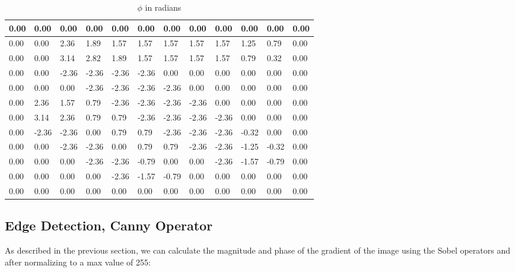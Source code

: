\documentclass[12pt, letterpaper]{article}
\begin{document}
\begin{table}[H]
    \centering
    \begin{tabular}{|l|l|l|l|l|l|l|l|l|l|l|l|}
    \hline
        0.00 & 0.00 & 0.00 & 0.00 & 0.00 & 0.00 & 0.00 & 0.00 & 0.00 & 0.00 & 0.00 & 0.00  \\ \hline
        0.00 & 0.00 & 2.36 & 1.89 & 1.57 & 1.57 & 1.57 & 1.57 & 1.57 & 1.25 & 0.79 & 0.00  \\ \hline
        0.00 & 0.00 & 3.14 & 2.82 & 1.89 & 1.57 & 1.57 & 1.57 & 1.57 & 0.79 & 0.32 & 0.00  \\ \hline
        0.00 & 0.00 & -2.36 & -2.36 & -2.36 & -2.36 & 0.00 & 0.00 & 0.00 & 0.00 & 0.00 & 0.00  \\ \hline
        0.00 & 0.00 & 0.00 & -2.36 & -2.36 & -2.36 & -2.36 & 0.00 & 0.00 & 0.00 & 0.00 & 0.00  \\ \hline
        0.00 & 2.36 & 1.57 & 0.79 & -2.36 & -2.36 & -2.36 & -2.36 & 0.00 & 0.00 & 0.00 & 0.00  \\ \hline
        0.00 & 3.14 & 2.36 & 0.79 & 0.79 & -2.36 & -2.36 & -2.36 & -2.36 & 0.00 & 0.00 & 0.00  \\ \hline
        0.00 & -2.36 & -2.36 & 0.00 & 0.79 & 0.79 & -2.36 & -2.36 & -2.36 & -0.32 & 0.00 & 0.00  \\ \hline
        0.00 & 0.00 & -2.36 & -2.36 & 0.00 & 0.79 & 0.79 & -2.36 & -2.36 & -1.25 & -0.32 & 0.00  \\ \hline
        0.00 & 0.00 & 0.00 & -2.36 & -2.36 & -0.79 & 0.00 & 0.00 & -2.36 & -1.57 & -0.79 & 0.00  \\ \hline
        0.00 & 0.00 & 0.00 & 0.00 & -2.36 & -1.57 & -0.79 & 0.00 & 0.00 & 0.00 & 0.00 & 0.00  \\ \hline
        0.00 & 0.00 & 0.00 & 0.00 & 0.00 & 0.00 & 0.00 & 0.00 & 0.00 & 0.00 & 0.00 & 0.00 \\ \hline
    \end{tabular}
    \caption{$\phi$ in radians}
\end{table}

\subsection{Edge Detection, Canny Operator}
As described in the previous section, we can calculate the magnitude and phase of the gradient of the image using the Sobel operators and after normalizing to a max value of 255:
\end{document}
